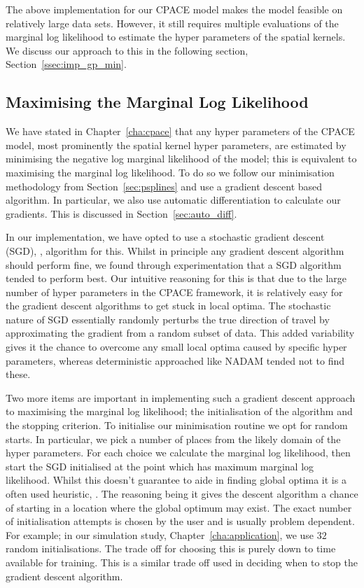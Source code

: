 The above implementation for our CPACE model makes the model feasible on relatively large data sets.
However, it still requires multiple evaluations of the marginal log likelihood to estimate the hyper parameters of the spatial kernels.
We discuss our approach to this in the following section, Section~\ref{ssec:imp_gp_min}.

\subsection{Maximising the Marginal Log Likelihood \label{ssec:imp_gp_min}}
We have stated in Chapter~\ref{cha:cpace} that any hyper parameters of the CPACE model, most prominently the spatial kernel hyper parameters, are estimated by minimising the negative log marginal likelihood of the model; this is equivalent to maximising the marginal log likelihood.
To do so we follow our minimisation methodology from Section~\ref{sec:psplines} and use a gradient descent based algorithm.
In particular, we also use automatic differentiation to calculate our gradients.
This is discussed in Section~\ref{sec:auto_diff}.

In our implementation, we have opted to use a stochastic gradient descent (SGD), \citep{sra_optimization_2012}, algorithm for this.
Whilst in principle any gradient descent algorithm should perform fine, we found through experimentation that a SGD algorithm tended to perform best.
Our intuitive reasoning for this is that due to the large number of hyper parameters in the CPACE framework, it is relatively easy for the gradient descent algorithms to get stuck in local optima.
The stochastic nature of SGD essentially randomly perturbs the true direction of travel by approximating the gradient from a random subset of data. 
This added variability gives it the chance to overcome any small local optima caused by specific hyper parameters, whereas deterministic approached like NADAM tended not to find these.

Two more items are important in implementing such a gradient descent approach to maximising the marginal log likelihood; the initialisation of the algorithm and the stopping criterion.
To initialise our minimisation routine we opt for random starts.
In particular, we pick a number of places from the likely domain of the hyper parameters.
For each choice we calculate the marginal log likelihood, then start the SGD initialised at the point which has maximum marginal log likelihood.
Whilst this doesn't guarantee to aide in finding global optima it is a often used heuristic, \citep{sra_optimization_2012}.
The reasoning being it gives the descent algorithm a chance of starting in a location where the global optimum may exist.
The exact number of initialisation attempts is chosen by the user and is usually problem dependent. 
For example; in our simulation study, Chapter~\ref{cha:application},  we use $32$ random initialisations.
The trade off for choosing this is purely down to time available for training.
This is a similar trade off used in deciding when to stop the gradient descent algorithm.

